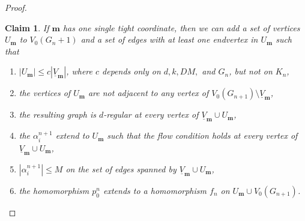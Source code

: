 \documentclass[10pt]{article}
\theoremstyle{plain}
\newtheorem{claim}[lemma]{Claim}
\theoremstyle{remark}
\newcommand{\1}{\mathbbm{1}}
\numberwithin{equation}{section}
\begin{document}
\begin{proof}
\begin{claim} \label{lemma:surgery}
If $\mathbf{m}$ has one single tight coordinate, then we can add a set of vertices $U_{\mathbf{m}}$ to $V_0({G_n+1})$ and a set of edges with at least one endvertex in $U_{\mathbf{m}}$ such that 

\begin{enumerate}

\item \label{egy}
$|U_{\mathbf{m}}| \leq c|\underline{V}_{\mathbf{m}}|$, where $c$ depends only on $d, k, DM,$ and $G_n$, but not on $K_n$,

\item 
the vertices of $U_{\mathbf{m}}$ are not adjacent to any vertex of 
$V_0(G_{n+1}) \setminus \underline{V}_{\mathbf{m}}$,

\item 
the resulting graph is $d$-regular at every vertex of $\underline{V}_{\mathbf{m}} \cup U_{\mathbf{m}}$,

\item \label{negy}
the $\alpha^{n+1}_i$ extend to $U_{\mathbf{m}}$ such that the flow condition holds at every vertex of $\underline{V}_{\mathbf{m}} \cup U_{\mathbf{m}}$,


\item \label{ot}
$|\alpha^{n+1}_i| \leq M$ on the set of edges spanned by $\underline{V}_{\mathbf{m}} \cup U_{\mathbf{m}}$,

\item
the homomorphism $p_0^n$ extends to a homomorphism $f_n$ on $U_{\mathbf{m}} \cup V_0(G_{n+1})$.


\end{enumerate} 
\end{claim}


\end{proof}
\end{document}
